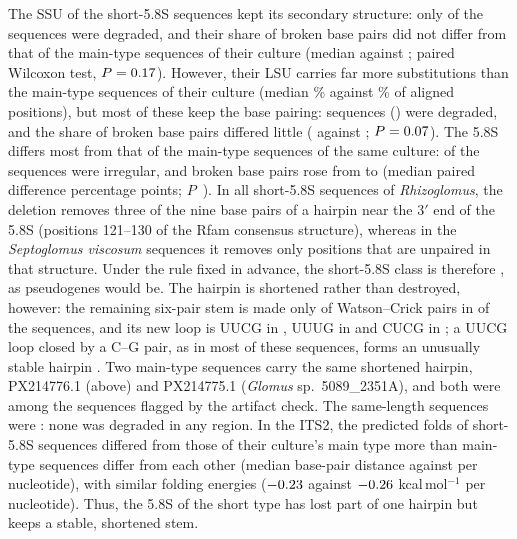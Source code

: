 \documentclass[11pt]{article}
\newcommand{\spn}[1]{\emph{#1}}   %
\begin{document}
The SSU of the short-5.8S sequences kept its secondary structure: only \FnSSUDeg{} of the \FnShortN{} sequences
were degraded, and their share of broken base pairs did not differ from that of the main-type sequences of their culture
(median \FnSSUBrokenShort{} against \FnSSUBrokenBase{}; paired Wilcoxon test, $P=0.17{}$). However, their LSU carries far
more substitutions than the main-type sequences of their culture (median \FnLSUSubs{}\% against \FnLSUSubsBase{}\%
of aligned positions), but most of these keep the base pairing: \FnLSUDeg{} sequences (\FnLSUDegPct{}) were degraded,
and the share of broken base pairs differed little (\FnLSUBrokenShort{} against \FnLSUBrokenBase{}; $P=0.07{}$).
The 5.8S differs most from that of the main-type sequences of the same culture: \FnFiveIrr{} of the \FnShortN{}
sequences were irregular, and broken base pairs rose from \FnFiveBrokenBase{} to \FnFiveBrokenShort{} (median paired
difference \FnFiveDiff{} percentage points; $P$~\FnFiveP{}). In all \FnHairpinShort{} short-5.8S sequences of
\spn{Rhizoglomus}, the deletion removes three of the nine base pairs of a hairpin near the 3$'$ end of the 5.8S
(positions 121--130 of the Rfam consensus structure), whereas in the \FnUnpairedShort{} \spn{Septoglomus viscosum}
sequences it removes only positions that are unpaired in that structure. Under the rule fixed in advance, the
short-5.8S class is therefore \FnVerdictShort{}, as pseudogenes would be. The hairpin is shortened rather than
destroyed, however: the remaining six-pair stem is made only of Watson--Crick pairs in \FnStemAllWC{} of the
\FnHairpinShort{} sequences, and its new loop is UUCG in \FnLoopUUCG{}, UUUG in \FnLoopUUUG{} and CUCG in
\FnLoopCUCG{}; a UUCG loop closed by a C--G pair, as in most of these sequences, forms an unusually stable hairpin
\cite{tuerk1988cuucgg}. Two main-type sequences carry the same shortened hairpin, PX214776.1 (above) and PX214775.1
(\spn{Glomus} sp.\ 5089\_2351A), and both were among the sequences flagged by the artifact check. The same-length
sequences were \FnVerdictSame{}: none was degraded in any region. In the ITS2, the predicted folds of short-5.8S
sequences differed from those of their culture's main type more than main-type sequences differ from each other
(median base-pair distance \FnITSTwoBPShort{} against \FnITSTwoBPBase{} per nucleotide), with similar folding
energies ($-0.23{}$ against $-0.26{}$ kcal\,mol$^{-1}$ per nucleotide). Thus, the 5.8S of the
short type has lost part of one hairpin but keeps a stable, shortened stem.
\end{document}
